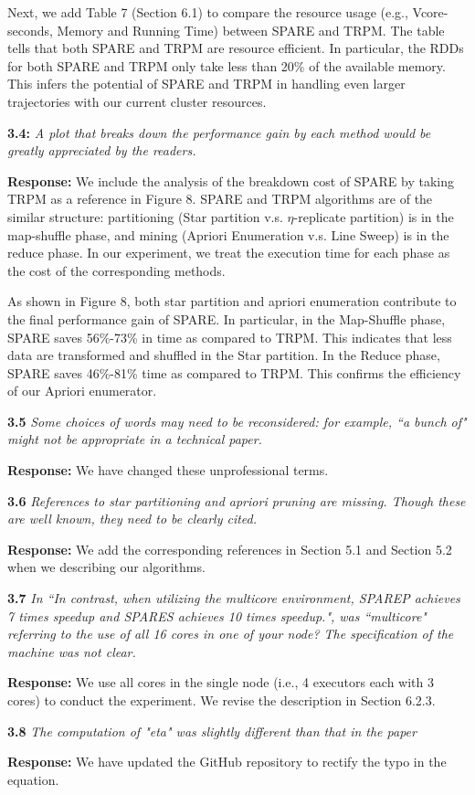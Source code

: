 Next, we add Table 7 (Section 6.1) to compare
the resource usage (e.g., Vcore-seconds, Memory and Running Time) between SPARE and TRPM.
The table tells that both SPARE and TRPM are resource efficient.
In particular, the RDDs for both SPARE and TRPM only take less than 20\% of 
the available memory. This infers the potential of SPARE and TRPM in handling 
even larger trajectories with our current cluster resources.



\textbf{3.4:} \emph{A plot that breaks down the performance gain by each method would
be greatly appreciated by the readers.}

\textbf{Response:} We include the analysis of
the breakdown cost of SPARE by taking TRPM as
a reference in Figure 8. 
SPARE and TRPM algorithms are of the similar structure: partitioning (Star partition v.s. $\eta$-replicate
partition) is in the map-shuffle phase, and  mining (Apriori Enumeration v.s. Line Sweep) 
is in the reduce phase. In our experiment, we treat the execution time
for each phase as the cost of the corresponding methods.

As shown in Figure 8,
both star partition and apriori enumeration contribute to 
the final performance gain of SPARE. In particular, in the Map-Shuffle phase,
SPARE saves 56\%-73\% in time as compared to TRPM. This indicates that 
less data are transformed and shuffled in the Star partition.
In the Reduce phase, SPARE saves 46\%-81\% time as compared to TRPM. This confirms 
the efficiency of our Apriori enumerator.



\textbf{3.5} \emph{Some choices of words may need to be reconsidered: for example, ``a bunch
of" might not be appropriate in a technical paper.}

\textbf{Response:} We have changed these unprofessional terms.



\textbf{3.6} \emph{References to star partitioning and apriori pruning are missing. Though these
are well known, they need to  be clearly cited.}

\textbf{Response:} We add the corresponding references in Section 5.1 and Section 5.2 when we
describing our algorithms.

\textbf{3.7} \emph{In ``In contrast, when utilizing the multicore
environment, SPAREP achieves 7 times speedup and SPARES achieves 10 times speedup.", was ``multicore"
referring to the use of all 16 cores in one of your node? The specification of the machine was not clear.}

\textbf{Response:} We use all cores in the single node (i.e., 4 executors each with 3 cores) to conduct the experiment. We revise the description in Section 6.2.3.



\textbf{3.8} \emph{The computation of "eta" was slightly different than that in the paper}

\textbf{Response:} We have updated the GitHub repository to rectify the typo in the equation.